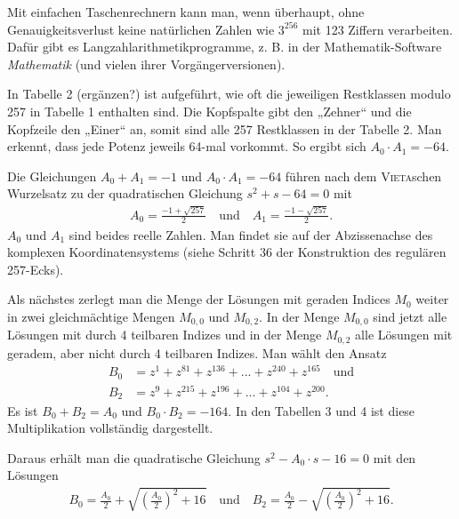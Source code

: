 \documentclass[11pt]{article}
\newcommand{\br}[1]{\ensuremath{\left(#1\right)}}
\begin{document}
Mit einfachen Taschenrechnern kann man, wenn überhaupt, ohne
Genauigkeitsverlust keine natürlichen Zahlen wie $3^{256}$ mit 123 Ziffern
verarbeiten. Dafür gibt es Langzahlarithmetikprogramme, z. B. in der
Mathematik-Software \emph{Mathematik} \cite{Polster2016} (und vielen ihrer
Vorgängerversionen). 

In Tabelle 2 (ergänzen?) ist aufgeführt, wie oft die jeweiligen Restklassen
modulo 257 in Tabelle 1 enthalten sind. Die Kopfspalte gibt den „Zehner“ und
die Kopfzeile den „Einer“ an, somit sind alle 257 Restklassen in der Tabelle
2. Man erkennt, dass jede Potenz jeweils 64-mal vorkommt. So ergibt sich
$A_{0} \cdot A_{1} = -64$.

Die Gleichungen $A_0 + A_1 = -1$ und $A_0 \cdot A_1 = -64$ führen nach dem
\textsc{Vieta}schen Wurzelsatz zu der quadratischen Gleichung $s^2 + s - 64 =
0$ mit 
\begin{gather*}
  A_0=\frac{-1+\sqrt{257}}{2}\quad\text{und}\quad A_1=\frac{-1-\sqrt{257}}{2}.
\end{gather*}
$A_0$ und $A_1$ sind beides reelle Zahlen. Man findet sie auf der
Abzissenachse des komplexen Koordinatensystems (siehe Schritt 36 der
Konstruktion des regulären 257-Ecks).

Als nächstes zerlegt man die Menge der Lösungen mit geraden Indices $M_{0}$
weiter in zwei gleichmächtige Mengen $M_{0,0}$ und $M_{0,2}$. In der Menge
$M_{0,0}$ sind jetzt alle Lösungen mit durch 4 teilbaren Indizes und in der
Menge $M_{0,2}$ alle Lösungen mit geradem, aber nicht durch 4 teilbaren
Indizes.  Man wählt den Ansatz 
\begin{align*}
  B_0 &= z^1 + z^{81} + z^{136} + ... + z^{240} + z^{165}\quad\text{und}\\ B_2
  &= z^9 + z^{215} + z^{196} + ... + z^{104} + z^{200}.
\end{align*}
Es ist $B_0 + B_2 = A_0$ und $B_0 \cdot B_2 = -164$. In den Tabellen 3 und 4
ist diese Multiplikation vollständig dargestellt.

Daraus erhält man die quadratische Gleichung $s^{2}- A_{0} \cdot s - 16 = 0$
mit den Lösungen
\begin{gather*}
  B_0 = \frac{A_0}{2}+ \sqrt{\br{\frac{A_0}{2}}^2+16}\quad\text{und}\quad B_2
  = \frac{A_0}{2}- \sqrt{\br{\frac{A_0}{2}}^2+16}.
\end{gather*}


\end{document}
